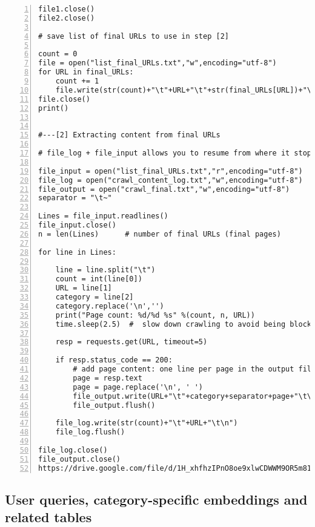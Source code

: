 \documentclass[oneside,10pt]{book}
\begin{document}
\begin{lstlisting}[numbers=left]
file1.close()
file2.close()

# save list of final URLs to use in step [2]

count = 0
file = open("list_final_URLs.txt","w",encoding="utf-8")
for URL in final_URLs:
    count += 1
    file.write(str(count)+"\t"+URL+"\t"+str(final_URLs[URL])+"\t\n")
file.close()
print()


#---[2] Extracting content from final URLs

# file_log + file_input allows you to resume from where it stopped (in case of crash)

file_input = open("list_final_URLs.txt","r",encoding="utf-8")
file_log = open("crawl_content_log.txt","w",encoding="utf-8")
file_output = open("crawl_final.txt","w",encoding="utf-8")
separator = "\t~"

Lines = file_input.readlines()
file_input.close()
n = len(Lines)      # number of final URLs (final pages)

for line in Lines:

    line = line.split("\t")
    count = int(line[0])
    URL = line[1]
    category = line[2]
    category.replace('\n','')
    print("Page count: %d/%d %s" %(count, n, URL))
    time.sleep(2.5)  #  slow down crawling to avoid being blocked
 
    resp = requests.get(URL, timeout=5)

    if resp.status_code == 200:
        # add page content: one line per page in the output file
        page = resp.text
        page = page.replace('\n', ' ')
        file_output.write(URL+"\t"+category+separator+page+"\t\n")
        file_output.flush()

    file_log.write(str(count)+"\t"+URL+"\t\n")
    file_log.flush()

file_log.close()
file_output.close()
https://drive.google.com/file/d/1H_xhfhzIPnO8oe9xlwCDWWM9OR5m81wd/view
\end{lstlisting}


\subsection{User queries, category-specific embeddings and related tables}\label{bernoc}
\end{document}
